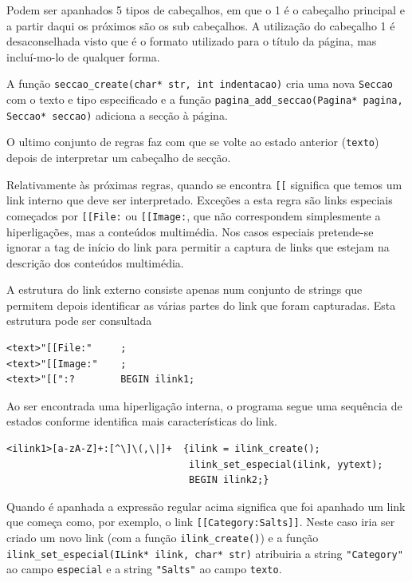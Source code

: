 \documentclass[11pt, a4paper, oneside]{article}
\begin{document}
Podem ser apanhados 5 tipos de cabeçalhos, em que o 1 é o cabeçalho principal e a partir daqui os próximos são os sub cabeçalhos. A utilização do cabeçalho 1 é desaconselhada visto que é o formato utilizado para o título da página, mas incluí-mo-lo de qualquer forma.

A função \texttt{seccao\_create(char* str, int indentacao)} cria uma nova \texttt{Seccao} com o texto e tipo especificado e a função \texttt{pagina\_add\_seccao(Pagina* pagina, Seccao* seccao)} adiciona a secção à página.

O ultimo conjunto de regras faz com que se volte ao estado anterior (\texttt{texto}) depois de interpretar um cabeçalho de secção.



Relativamente às próximas regras, quando se encontra \texttt{[[} significa que temos um link interno que deve ser interpretado. Exceções a esta regra são links especiais começados por \texttt{[[File:} ou \texttt{[[Image:}, que não correspondem simplesmente a hiperligações, mas a conteúdos multimédia. Nos casos especiais pretende-se ignorar a tag de início do link para permitir a captura de links que estejam na descrição dos conteúdos multimédia.

A estrutura do link externo consiste apenas num conjunto de strings que permitem depois identificar as várias partes do link que foram capturadas. Esta estrutura pode ser consultada 

\begin{verbatim}
<text>"[[File:"     ;
<text>"[[Image:"    ;
<text>"[[":?        BEGIN ilink1;
\end{verbatim}

Ao ser encontrada uma hiperligação interna, o programa segue uma sequência de estados conforme identifica mais características do link.
\begin{verbatim}
<ilink1>[a-zA-Z]+:[^\]\(,\|]+  {ilink = ilink_create();
                                ilink_set_especial(ilink, yytext); 
                                BEGIN ilink2;}
\end{verbatim}

Quando é apanhada a expressão regular acima significa que foi apanhado um link que começa como, por exemplo, o link \texttt{[[Category:Salts]]}. Neste caso iria ser criado um novo link (com a função \texttt{ilink\_create()}) e a função \texttt{ilink\_set\_especial(ILink* ilink, char* str)} atribuiria a string \texttt{"Category"} ao campo \texttt{especial} e a string \texttt{"Salts"} ao campo \texttt{texto}.
\end{document}
